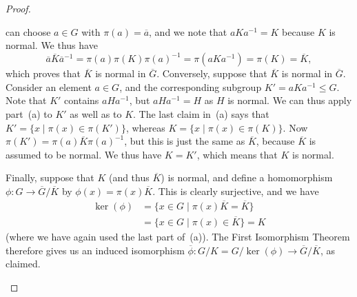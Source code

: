 \documentclass{amsart}
\newcommand{\ov}[1]     {\overline{#1}}
\newcommand{\st}        {\;|\;}
\renewcommand{\:}{\colon}
\theoremstyle{definition}
\begin{document}
\begin{proof}
\begin{itemize}
   can choose $a\in G$ with $\pi(a)=\ov{a}$, and we note that
   $aKa^{-1}=K$  because $K$ is normal.  We thus have
   \[ \ov{a}\ov{K}\ov{a}^{-1}=\pi(a)\pi(K)\pi(a)^{-1}=\pi(aKa^{-1})=
       \pi(K)=\ov{K},
   \]
   which proves that $\ov{K}$ is normal in $\ov{G}$.  Conversely,
   suppose that $\ov{K}$ is normal in $\ov{G}$.  Consider an element
   $a\in G$, and the corresponding subgroup $K'=aKa^{-1}\leq G$.  Note
   that $K'$ contains $aHa^{-1}$, but $aHa^{-1}=H$ as $H$ is normal.
   We can thus apply part~(a) to $K'$ as well as to $K$.  The last
   claim in~(a) says that $K'=\{x\st\pi(x)\in\pi(K')\}$, whereas
   $K=\{x\st\pi(x)\in\pi(K)\}$.  Now
   $\pi(K')=\pi(a)\ov{K}\pi(a)^{-1}$, but this is just the same as
   $\ov{K}$, because $\ov{K}$ is assumed to be normal.  We thus have
   $K=K'$, which means that $K$ is normal.

   Finally, suppose that $K$ (and thus $\ov{K}$) is normal, and define
   a homomorphism $\phi\:G\to\ov{G}/\ov{K}$ by
   $\phi(x)=\pi(x)\ov{K}$.  This is clearly surjective, and we have 
   \begin{align*}
    \ker(\phi) &= \{x\in G\st \pi(x)\ov{K} = \ov{K}\} \\
      &= \{x\in G\st \pi(x)\in\ov{K}\} = K
   \end{align*}
   (where we have again used the last part of~(a)).  The First
   Isomorphism Theorem therefore gives us an induced isomorphism
   $\ov{\phi}\:G/K=G/\ker(\phi)\to\ov{G}/\ov{K}$, as claimed.
 \end{itemize}
\end{proof}
\end{document}
